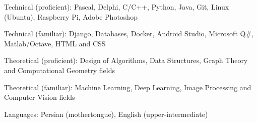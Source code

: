 

\begin{cvskills}

  \cvskill
    {Technical (proficient):}
    {Pascal, Delphi, C/C++, Python, Java, Git, Linux (Ubuntu), Raspberry Pi, Adobe Photoshop}

  \cvskill
    {Technical (familiar):}
    {Django, Databases, Docker, Android Studio, Microsoft Q\#, Matlab/Octave, HTML and CSS}

  \cvskill
    {Theoretical (proficient):}
    {Design of Algorithms, Data Structures, Graph Theory and Computational Geometry fields}

  \cvskill
    {Theoretical (familiar):}
    {Machine Learning, Deep Learning, Image Processing and Computer Vision fields}

  \cvskill
    {Languages:}
    {Persian (mothertongue), English (upper-intermediate)} %

\end{cvskills}
